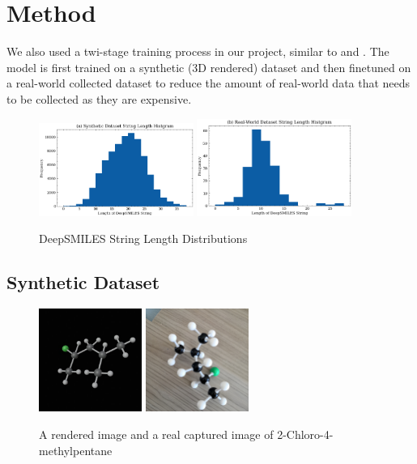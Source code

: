 \documentclass[12pt]{article}
\begin{document}

\section{Method}
We also used a twi-stage training process in our project, similar to \autocite{decimer} and \autocite{chempix}. The model is first trained on a synthetic (3D rendered) dataset and then finetuned on a real-world collected dataset to reduce the amount of real-world data that needs to be collected as they are expensive.  


\begin{figure}
    \centering
    \includegraphics[width=0.45\textwidth]{sy_len.png}
    \includegraphics[width=0.45\textwidth]{real_len.png}
    \caption{DeepSMILES String Length Distributions}
    \label{fig:dis}
\end{figure}

\subsection{Synthetic Dataset}
\begin{figure}
    \centering
    \includegraphics[width=0.3\textwidth]{generated}
    \includegraphics[width=0.3\textwidth]{cap}
    \caption{A rendered image and a real captured image of 2-Chloro-4-methylpentane}
    \label{fig:example}
\end{figure}
\end{document}
